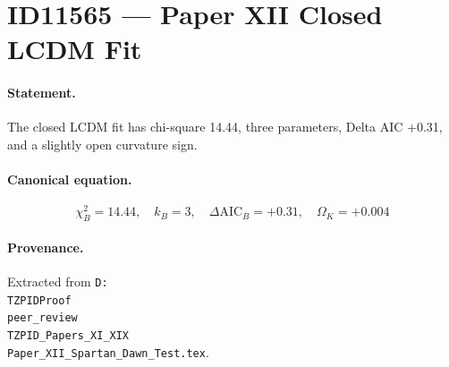 \section*{ID11565 --- Paper XII Closed LCDM Fit}

\paragraph{Statement.}
The closed LCDM fit has chi-square 14.44, three parameters, Delta AIC +0.31, and a slightly open curvature sign.

\paragraph{Canonical equation.}
\[
\chi^2_B=14.44,\quad k_B=3,\quad\Delta\mathrm{AIC}_B=+0.31,\quad\Omega_K=+0.004
\]

\paragraph{Provenance.}
Extracted from \texttt{D:\\TZPIDProof\\peer\_review\\TZPID\_Papers\_XI\_XIX\\Paper\_XII\_Spartan\_Dawn\_Test.tex}.
